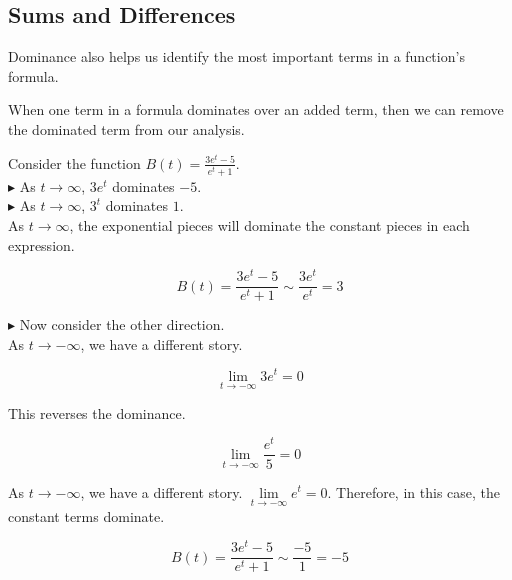 \documentclass{ximera}
\begin{document}
\subsection*{Sums and Differences}


Dominance also helps us identify the most important terms in a function's formula.


When one term in a formula dominates over an added term, then we can remove the dominated term from our analysis. \\






\begin{example}

Consider the function $B(t) = \frac{3e^t - 5}{e^t + 1}$. \\


$\blacktriangleright$ As $t \to \infty$, $3e^t$ dominates $-5$. \\

$\blacktriangleright$ As $t \to \infty$, $3^t$ dominates $1$. \\




As $t \to \infty$, the exponential pieces will dominate the constant pieces in each expression.  

\[   B(t) = \frac{3e^t - 5}{e^t + 1} \sim \frac{3 e^t}{e^t} = 3   \]




\textbf{\textcolor{blue!55!black}{$\blacktriangleright$}} Now consider the other direction. \\


As $t \to -\infty$, we have a different story.   



\[   \lim\limits_{t \to -\infty} 3 e^t  = 0  \]


This reverses the dominance.


\[   \lim\limits_{t \to -\infty} \frac{e^t}{5} = 0   \]



As $t \to -\infty$, we have a different story.  $\lim\limits_{t \to -\infty} e^t = 0$. Therefore, in this case, the constant terms dominate.


\[   B(t) = \frac{3e^t - 5}{e^t + 1} \sim \frac{-5}{1} = -5   \]








\end{example}
\end{document}
